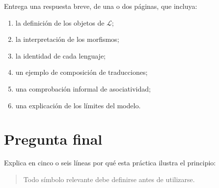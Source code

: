 \documentclass[11pt,a4paper]{article}
\newcommand{\Cat}{\mathcal{L}}
\begin{document}
Entrega una respuesta breve, de una o dos páginas, que incluya:

\begin{enumerate}
  \item la definición de los objetos de \(\Cat\);
  \item la interpretación de los morfismos;
  \item la identidad de cada lenguaje;
  \item un ejemplo de composición de traducciones;
  \item una comprobación informal de asociatividad;
  \item una explicación de los límites del modelo.
\end{enumerate}

\section*{Pregunta final}

Explica en cinco o seis líneas por qué esta práctica ilustra el principio:

\begin{quote}
  Todo símbolo relevante debe definirse antes de utilizarse.
\end{quote}
\end{document}
